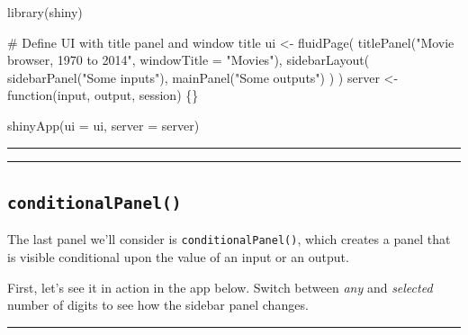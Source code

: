 \documentclass[
  letterpaper,
  DIV=11,
  numbers=noendperiod]{scrreprt}
\newenvironment{Shaded}{\begin{snugshade}}{\end{snugshade}}
\newcommand{\AttributeTok}[1]{\textcolor[rgb]{0.40,0.46,0.14}{#1}}
\newcommand{\CommentTok}[1]{\textcolor[rgb]{0.37,0.37,0.37}{#1}}
\newcommand{\ControlFlowTok}[1]{\textcolor[rgb]{0.00,0.46,0.62}{#1}}
\newcommand{\FunctionTok}[1]{\textcolor[rgb]{0.28,0.35,0.67}{#1}}
\newcommand{\NormalTok}[1]{\textcolor[rgb]{0.00,0.46,0.62}{#1}}
\newcommand{\OtherTok}[1]{\textcolor[rgb]{0.00,0.46,0.62}{#1}}
\newcommand{\StringTok}[1]{\textcolor[rgb]{0.13,0.47,0.30}{#1}}
\begin{document}
\begin{Shaded}
\begin{Highlighting}[]
\FunctionTok{library}\NormalTok{(shiny)}

\CommentTok{\# Define UI with title panel and window title}
\NormalTok{ui }\OtherTok{\textless{}{-}} \FunctionTok{fluidPage}\NormalTok{(}
  \FunctionTok{titlePanel}\NormalTok{(}\StringTok{"Movie browser, 1970 to 2014"}\NormalTok{,}
             \AttributeTok{windowTitle =} \StringTok{"Movies"}\NormalTok{),}
  \FunctionTok{sidebarLayout}\NormalTok{(}
    \FunctionTok{sidebarPanel}\NormalTok{(}\StringTok{"Some inputs"}\NormalTok{),}
    \FunctionTok{mainPanel}\NormalTok{(}\StringTok{"Some outputs"}\NormalTok{)}
\NormalTok{  )}
\NormalTok{)}
\NormalTok{server }\OtherTok{\textless{}{-}} \ControlFlowTok{function}\NormalTok{(input, output, session) \{\}}

\FunctionTok{shinyApp}\NormalTok{(}\AttributeTok{ui =}\NormalTok{ ui, }\AttributeTok{server =}\NormalTok{ server)}
\end{Highlighting}
\end{Shaded}

\begin{center}\rule{0.5\linewidth}{0.5pt}\end{center}

\begin{center}\rule{0.5\linewidth}{0.5pt}\end{center}

\hypertarget{conditionalpanel}{%
\subsection{\texorpdfstring{\texttt{conditionalPanel()}}{conditionalPanel()}}\label{conditionalpanel}}

The last panel we'll consider is \texttt{conditionalPanel()}, which
creates a panel that is visible conditional upon the value of an input
or an output.

First, let's see it in action in the app below. Switch between
\emph{any} and \emph{selected} number of digits to see how the sidebar
panel changes.

\begin{center}\rule{0.5\linewidth}{0.5pt}\end{center}
\end{document}

